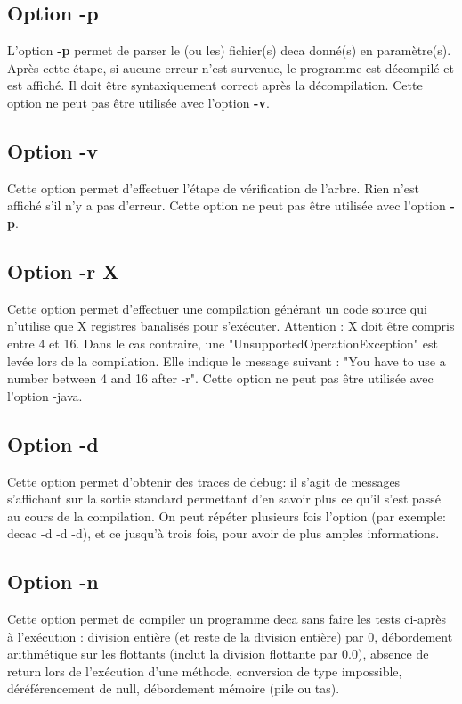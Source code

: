 \documentclass[12pt, a4paper, one side]{article}
\begin{document}
    \subsection{Option -p}

    L'option \textbf{-p} permet de parser le (ou les) fichier(s) deca donné(s) en paramètre(s).
    Après cette étape, si aucune erreur n'est survenue, le programme est décompilé et est
    affiché. Il doit être syntaxiquement correct après la décompilation. Cette option ne peut
    pas être utilisée avec l'option \textbf{-v}.

    \subsection{Option -v}

    Cette option permet d'effectuer l'étape de vérification de l'arbre. Rien n'est affiché s'il
    n'y a pas d'erreur. Cette option ne peut pas être utilisée avec l'option \textbf{-p}.

    \subsection{Option -r X}
    Cette option permet d'effectuer une compilation générant un code source qui n'utilise que X registres banalisés pour s’exécuter. Attention : X doit être compris entre 4 et 16. Dans le cas contraire, une "UnsupportedOperationException" est levée lors de la compilation. Elle indique le message suivant : "You have to use a number between 4 and 16 after -r".
    Cette option ne peut pas être utilisée avec l'option -java.

    \subsection{Option -d}

    Cette option permet d'obtenir des traces de debug: il s'agit de messages s'affichant sur la sortie standard permettant d'en savoir plus ce qu'il s'est passé au cours de la compilation. On peut répéter plusieurs fois l'option (par exemple: decac -d -d -d), et ce jusqu'à trois fois, pour avoir de plus amples informations.

    \subsection{Option -n}

    Cette option permet de compiler un programme deca sans faire les tests ci-après à l’exécution : division entière (et reste de la division entière) par 0, débordement arithmétique sur les flottants (inclut la division flottante par 0.0), absence de return lors de l’exécution d’une méthode, conversion de type impossible, déréférencement de null, débordement mémoire (pile ou tas).
\end{document}
